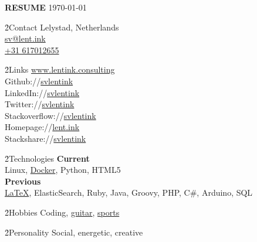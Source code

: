 \LARGE \textbf{RESUME}
\scriptsize \today \normalsize



\h{2}{Contact}{}
Lelystad, Netherlands \\
\href{mailto:sv@lent.ink}{sv@lent.ink} \\
\href{tel:0031617012655}{+31 617012655}

\h{2}{Links}{}
\href{https://lentink.consulting}{www.lentink.consulting} \\
Github://\href{http://github.com/svlentink}{svlentink} \\
LinkedIn://\href{http://linkedin.com/in/svlentink}{svlentink} \\
Twitter://\href{http://twitter.com/svlentink}{svlentink} \\
Stackoverflow://\href{http://stackoverflow.com/users/3037245/svlentink}{svlentink} \\
Homepage://\href{http://lent.ink}{lent.ink} \\
Stackshare://\href{http://stackshare.io/svlentink/lent-ink}{svlentink}

\h{2}{Technologies}{}
\textbf{Current} \\
Linux,
\href{http://hub.docker.com/r/svlentink}{Docker},
Python,
HTML5
\\
\textbf{Previous} \\
\href{https://github.com/svlentink/resume}{LaTeX},
ElasticSearch,
Ruby,
Java,
Groovy,
PHP,
C\#,
Arduino,
SQL


\h{2}{Hobbies}{}
Coding,
\href{http://lent.ink/projects/chords}{guitar},
\href{http://lent.ink/projects/run}{sports}

\h{2}{Personality}{}
Social, energetic, creative

